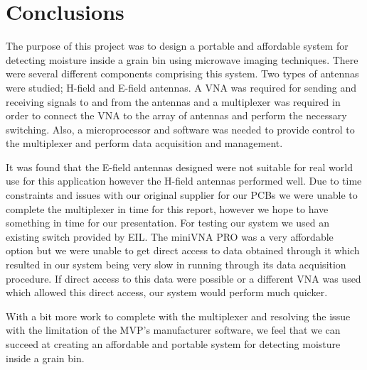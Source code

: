
\chapter[Conclusions]{Conclusions}
\label{sec:conclusions}

The purpose of this project was to design a portable and affordable system for detecting moisture inside a grain bin using microwave imaging techniques. There were several different components comprising this system. Two types of antennas were studied; H-field and E-field antennas. A VNA was required for sending and receiving signals to and from the antennas and a multiplexer was required in order to connect the VNA to the array of antennas and perform the necessary switching. Also, a microprocessor and software was needed to provide control to the multiplexer and perform data acquisition and management.

It was found that the E-field antennas designed were not suitable for real world use for this application however the H-field antennas performed well. Due to time constraints and issues with our original supplier for our PCBs we were unable to complete the multiplexer in time for this report, however we hope to have something in time for our presentation. For testing our system we used an existing switch provided by EIL. The miniVNA PRO was a very affordable option but we were unable to get direct access to data obtained through it which resulted in our system being very slow in running through its data acquisition procedure. If direct access to this data were possible or a different VNA was used which allowed this direct access, our system would perform much quicker.

With a bit more work to complete with the multiplexer and resolving the issue with the limitation of the MVP's manufacturer software, we feel that we can succeed at creating an affordable and portable system for detecting moisture inside a grain bin.